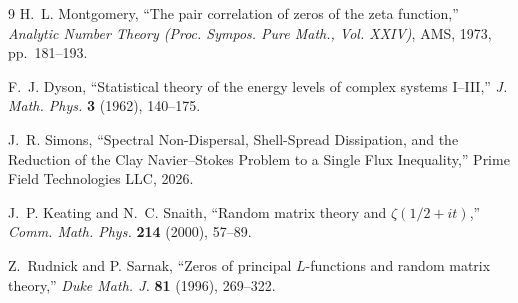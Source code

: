 \documentclass[12pt]{article}
\begin{document}
\bigskip

\begin{thebibliography}{9}
H.~L. Montgomery, ``The pair correlation of zeros of the zeta function,'' 
\textit{Analytic Number Theory (Proc. Sympos. Pure Math., Vol. XXIV)}, 
AMS, 1973, pp.~181--193.

F.~J. Dyson, ``Statistical theory of the energy levels of complex systems I--III,'' 
\textit{J. Math. Phys.} \textbf{3} (1962), 140--175.

J.~R. Simons, ``Spectral Non-Dispersal, Shell-Spread Dissipation, and 
the Reduction of the Clay Navier--Stokes Problem to a Single Flux Inequality,'' 
Prime Field Technologies LLC, 2026.

J.~P. Keating and N.~C. Snaith, ``Random matrix theory and $\zeta(1/2+it)$,'' 
\textit{Comm. Math. Phys.} \textbf{214} (2000), 57--89.

Z.~Rudnick and P. Sarnak, ``Zeros of principal $L$-functions and random matrix 
theory,'' \textit{Duke Math. J.} \textbf{81} (1996), 269--322.
\end{thebibliography}
\end{document}
